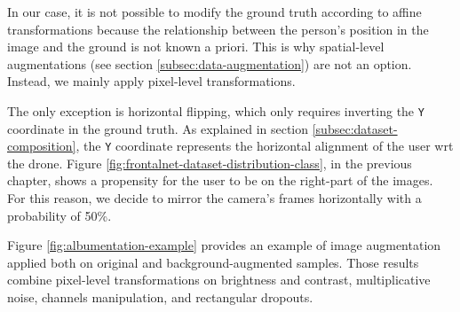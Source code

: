 \medskip

In our case, it is not possible to modify the ground truth according to affine transformations because the relationship between the person's position in the image and the ground is not known a priori. This is why spatial-level augmentations (see section \ref{subsec:data-augmentation}) are not an option. Instead, we mainly apply pixel-level transformations.

The only exception is horizontal flipping, which only requires inverting the \texttt{Y} coordinate in the ground truth. As explained in section \ref{subsec:dataset-composition}, the \texttt{Y} coordinate represents the horizontal alignment of the user \gls{wrt} the drone. Figure \ref{fig:frontalnet-dataset-distribution-class}, in the previous chapter, shows a propensity for the user to be on the right-part of the images. For this reason, we decide to mirror the camera's frames horizontally with a probability of 50\%.

Figure \ref{fig:albumentation-example} provides an example of image augmentation applied both on original and background-augmented samples. Those results combine pixel-level transformations on brightness and contrast, multiplicative noise, channels manipulation, and rectangular dropouts.

